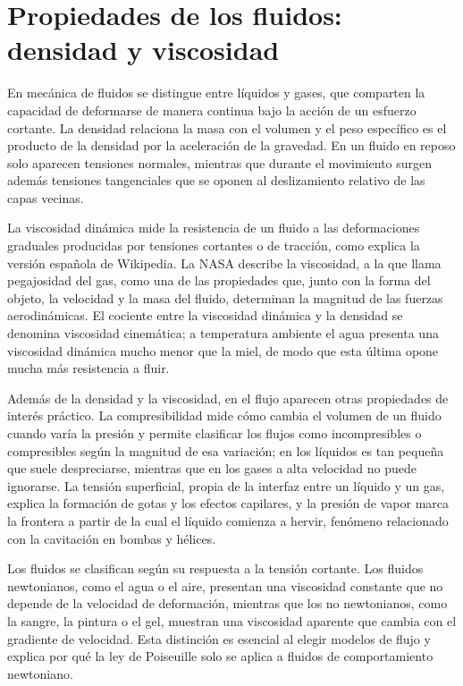 \documentclass{book}
\begin{document}
\chapter{Propiedades de los fluidos: densidad y viscosidad}

En mecánica de fluidos se distingue entre líquidos y gases, que comparten la capacidad de deformarse de manera continua bajo la acción de un esfuerzo cortante. La densidad relaciona la masa con el volumen y el peso específico es el producto de la densidad por la aceleración de la gravedad. En un fluido en reposo solo aparecen tensiones normales, mientras que durante el movimiento surgen además tensiones tangenciales que se oponen al deslizamiento relativo de las capas vecinas.

La viscosidad dinámica mide la resistencia de un fluido a las deformaciones graduales producidas por tensiones cortantes o de tracción, como explica la versión española de Wikipedia. La NASA describe la viscosidad, a la que llama pegajosidad del gas, como una de las propiedades que, junto con la forma del objeto, la velocidad y la masa del fluido, determinan la magnitud de las fuerzas aerodinámicas. El cociente entre la viscosidad dinámica y la densidad se denomina viscosidad cinemática; a temperatura ambiente el agua presenta una viscosidad dinámica mucho menor que la miel, de modo que esta última opone mucha más resistencia a fluir.

Además de la densidad y la viscosidad, en el flujo aparecen otras propiedades de interés práctico. La compresibilidad mide cómo cambia el volumen de un fluido cuando varía la presión y permite clasificar los flujos como incompresibles o compresibles según la magnitud de esa variación; en los líquidos es tan pequeña que suele despreciarse, mientras que en los gases a alta velocidad no puede ignorarse. La tensión superficial, propia de la interfaz entre un líquido y un gas, explica la formación de gotas y los efectos capilares, y la presión de vapor marca la frontera a partir de la cual el líquido comienza a hervir, fenómeno relacionado con la cavitación en bombas y hélices.

Los fluidos se clasifican según su respuesta a la tensión cortante. Los fluidos newtonianos, como el agua o el aire, presentan una viscosidad constante que no depende de la velocidad de deformación, mientras que los no newtonianos, como la sangre, la pintura o el gel, muestran una viscosidad aparente que cambia con el gradiente de velocidad. Esta distinción es esencial al elegir modelos de flujo y explica por qué la ley de Poiseuille solo se aplica a fluidos de comportamiento newtoniano.
\end{document}
